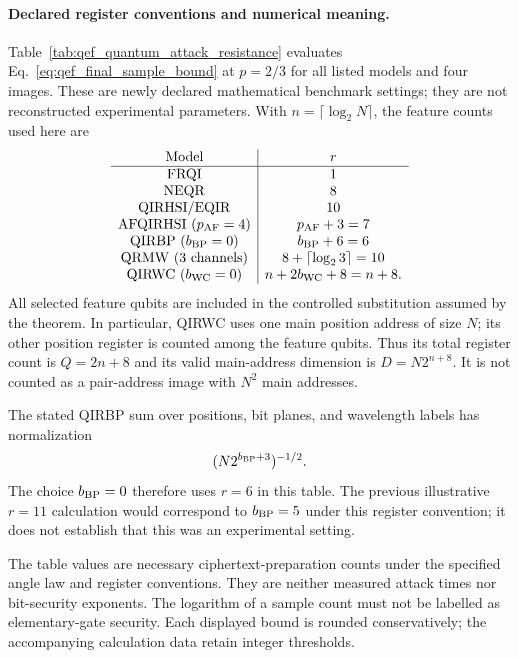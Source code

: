 {\paragraph{Declared register conventions and numerical meaning.}
Table~\ref{tab:qef_quantum_attack_resistance} evaluates
Eq.~\eqref{eq:qef_final_sample_bound} at $p=2/3$ for all listed models
and four images. These are newly declared mathematical benchmark
settings; they are not reconstructed experimental parameters.
With $n=\lceil\log_2N\rceil$, the feature counts used here are
\begin{equation}
\begin{array}{c|c}
\text{Model}&r\\\hline
\mathrm{FRQI}&1\\
\mathrm{NEQR}&8\\
\mathrm{QIRHSI/EQIR}&10\\
\mathrm{AFQIRHSI}\ (p_{\rm AF}=4)&p_{\rm AF}+3=7\\
\mathrm{QIRBP}\ (b_{\rm BP}=0)&b_{\rm BP}+6=6\\
\mathrm{QRMW}\ (3\text{ channels})&8+\lceil\log_2 3\rceil=10\\
\mathrm{QIRWC}\ (b_{\rm WC}=0)&n+2b_{\rm WC}+8=n+8.
\end{array}
\end{equation}
All selected feature qubits are included in the controlled substitution
assumed by the theorem. In particular, QIRWC uses one main position
address of size $N$; its other position register is counted among the
feature qubits. Thus its total register count is $Q=2n+8$ and its valid
main-address dimension is $D=N2^{n+8}$. It is not counted as a
pair-address image with $N^2$ main addresses.

The stated QIRBP sum over positions, bit planes, and wavelength labels
has normalization
\[
 (N2^{b_{\rm BP}+3})^{-1/2}.
\]
The choice $b_{\rm BP}=0$ therefore
uses $r=6$ in this table. The previous illustrative $r=11$ calculation
would correspond to $b_{\rm BP}=5$ under this register convention; it
does not establish that this was an experimental setting.

The table values are necessary ciphertext-preparation counts under the
specified angle law and register conventions. They are neither measured
attack times nor bit-security exponents. The logarithm of a sample count
must not be labelled as elementary-gate security. Each displayed bound
is rounded conservatively; the accompanying calculation data retain
integer thresholds.



}

